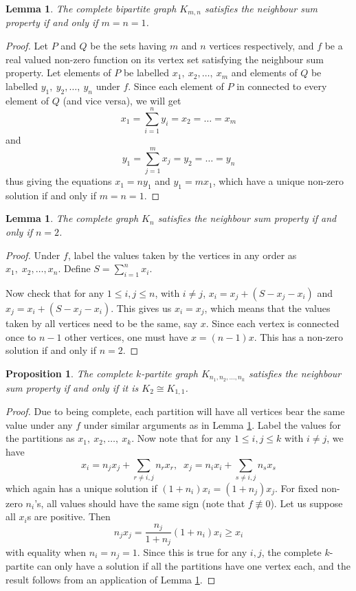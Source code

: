\documentclass[11pt]{article}
\newtheorem{prp}[nummer]{Proposition}
\newtheorem{lem}[nummer]{Lemma}
\begin{document}
\begin{lem}\label{bip}
    The complete bipartite graph $K_{m,n}$ satisfies the neighbour sum property if and only if $m=n=1$.
\end{lem}
\begin{proof}
    Let $P$ and $Q$ be the sets having $m$ and $n$ vertices respectively, and $f$ be a real valued non-zero function on its vertex set satisfying the neighbour sum property. Let elements of $P$ be labelled $x_1,\:x_2,\ldots,\:x_m$ and elements of $Q$ be labelled $y_1,\:y_2,\ldots,\:y_n$ under $f$. Since each element of $P$ in connected to every element of $Q$ (and vice versa), we will get
    $$x_1=\sum_{i=1}^n y_i=x_2=\ldots=x_m$$
    and
    $$y_1=\sum_{j=1}^mx_j=y_2=\ldots=y_n$$
    thus giving the equations $x_1=ny_1$ and $y_1=mx_1$, which have a unique non-zero solution if and only if $m=n=1$.
\end{proof}

\begin{lem}\label{complete}
    The complete graph $K_n$ satisfies the neighbour sum property if and only if $n=2$.
\end{lem}
\begin{proof}
    Under $f$, label the values taken by the vertices in any order as $x_1,\;x_2,\ldots,x_n$. Define $S=\sum_{i=1}^n x_i$.

    Now check that for any $1\leq i,j\leq n$, with $i\neq j$, $x_i=x_j+(S-x_j-x_i)$ and $x_j = x_i+(S-x_j-x_i)$. This gives us $x_i=x_j$, which means that the values taken by all vertices need to be the same, say $x$. Since each vertex is connected once to $n-1$ other vertices, one must have $x=(n-1)x$. This has a non-zero solution if and only if $n=2$.
\end{proof}

\begin{prp}
    The complete $k$-partite graph $K_{n_1,n_2,\ldots,n_k}$ satisfies the neighbour sum property if and only if it is $K_2 \cong K_{1,1}$.
\end{prp}
\begin{proof}
Due to being complete, each partition will have all vertices bear the same value under any $f$ under similar arguments as in Lemma \ref{bip}. Label the values for the partitions as $x_1,\:x_2,\ldots,\:x_k$. Now note that for any $1\leq i,j\leq k$ with $i\neq j$, we have
$$x_i=n_jx_j+\sum_{r\neq i,j}n_rx_r,\;\;x_j=n_ix_i+\sum_{s\neq i,j}n_sx_s$$
which again has a unique solution if $(1+n_i)x_i=(1+n_j)x_j$. For fixed non-zero $n_i$'s, all values should have the same sign (note that $f\not\equiv 0$). Let us suppose all $x_i$s are positive. Then $$n_jx_j = \dfrac{n_j}{1+n_j}(1+n_i)x_i\geq x_i$$ with equality when $n_i=n_j=1$. Since this is true for any $i,j$, the complete $k$-partite can only have a solution if all the partitions have one vertex each, and the result follows from an application of Lemma \ref{complete}.
\end{proof}
\end{document}
